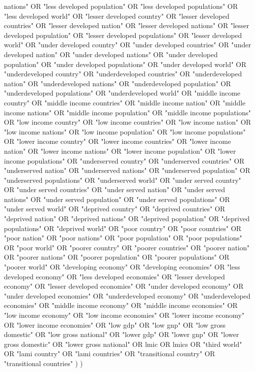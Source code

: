 \documentclass[12pt]{article}
\begin{document}
nations" OR "less developed population" OR "less developed populations" OR "less developed world" OR "lesser developed country" OR "lesser developed countries" OR "lesser developed nation" OR "lesser developed nations" OR "lesser developed population" OR "lesser developed populations" OR "lesser developed world" OR "under developed country" OR "under developed countries" OR "under developed nation" OR "under developed nations" OR "under developed population" OR "under developed populations" OR "under developed world" OR "underdeveloped country" OR "underdeveloped countries" OR "underdeveloped nation" OR "underdeveloped nations" OR "underdeveloped population" OR "underdeveloped populations" OR "underdeveloped world" OR "middle income country" OR "middle income countries" OR "middle income nation" OR "middle income nations" OR "middle income population" OR "middle income populations" OR "low income country" OR "low income countries" OR "low income nation" OR "low income nations" OR "low income population" OR "low income populations" OR "lower income country" OR "lower income countries" OR "lower income nation" OR "lower income nations" OR "lower income population" OR "lower income populations" OR "underserved country" OR "underserved countries" OR "underserved nation" OR "underserved nations" OR "underserved population" OR "underserved populations" OR "underserved world" OR "under served country" OR "under served countries" OR "under served nation" OR "under served nations" OR "under served population" OR "under served populations" OR "under served world" OR "deprived country" OR "deprived countries" OR "deprived nation" OR "deprived nations" OR "deprived population" OR "deprived populations" OR "deprived world" OR "poor country" OR "poor countries" OR "poor nation" OR "poor nations" OR "poor population" OR "poor populations" OR "poor world" OR "poorer country" OR "poorer countries" OR "poorer nation" OR "poorer nations" OR "poorer population" OR "poorer populations" OR "poorer world" OR "developing economy" OR "developing economies" OR "less developed economy" OR "less developed economies" OR "lesser developed economy" OR "lesser developed economies" OR "under developed economy" OR "under developed economies" OR "underdeveloped economy" OR "underdeveloped economies" OR "middle income economy" OR "middle income economies" OR "low income economy" OR "low income economies" OR "lower income economy" OR "lower income economies" OR "low gdp" OR "low gnp" OR "low gross domestic" OR "low gross national" OR "lower gdp" OR "lower gnp" OR "lower gross domestic" OR "lower gross national" OR lmic OR lmics OR "third world" OR "lami country" OR "lami countries" OR "transitional country" OR "transitional countries" ) )
\end{document}
